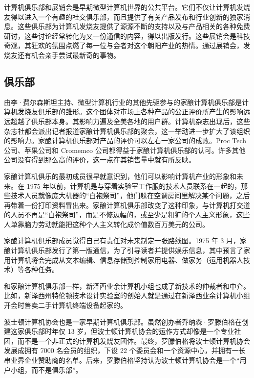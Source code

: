 \documentclass[12pt,UTF8]{ctexbook}
\begin{document}
计算机俱乐部和展销会是早期微型计算机世界的公共平台。它们不仅让计算机发烧友得以进入一个有趣的社交俱乐部，而且提供了有关产品发布和行业创新的独家消息。这些俱乐部为计算机发烧友提供了源源不断的支持以及与产品相关的各种免费研讨，这些讨论经常转化为又一份通信的内容，得以出版发行。这些展销会是科技奇观，其狂欢的氛围点燃了每一位与会者对这个朝阳产业的热情。通过展销会，发烧友还有机会亲手尝试最新奇的事物。





\subsection{俱乐部}


由李·费尔森斯坦主持、微型计算机行业的其他先驱参与的家酿计算机俱乐部是计算机发烧友俱乐部的雏形。这个团体对市场上各种产品的公正评价所产生的影响远远超越了俱乐部本身。其影响力遍及全美各地的用户群。计算机杂志出现后，这些杂志社都会派出记者报道家酿计算机俱乐部的聚会，这一举动进一步扩大了该组织的影响力。家酿计算机俱乐部对产品的评价可以左右一家公司的成败。Proc Tech 公司、苹果公司和 Cromemco 公司都得益于家酿计算机俱乐部的认可。许多其他公司没有得到那么高的评价，这一点在其销售量中就有所反映。

家酿计算机俱乐的最初成员很早就意识到，他们可以影响计算机产业的形象和未来。在 1975 年以前，计算机是与穿着实验室工作服的技术人员联系在一起的，那些技术人员就像庞大机器的“白袍祭司”，他们躲在空调房间里解决某个问题，之后再带着一份打印资料冒出来。家酿计算机俱乐部改变了这种印象，与计算机打交道的人员不再是“白袍祭司”，而是不修边幅的，或至少是粗犷的个人主义形象，这些人单靠脑力劳动就能把这种个人主义转化成价值数百万美元的公司。

家酿计算机俱乐部成员觉得自己有责任对未来制定一张路线图。1975 年 3 月，家酿计算机俱乐部发行了第一版通信，为了引导读者并提供娱乐信息，其中预言了家用计算机将会完成从文本编辑、信息存储到控制家用电器、做家务（运用机器人技术）等各种任务。

和家酿计算机俱乐部一样，新泽西业余计算机小组也成了新技术的仲裁者和中介。比如，新泽西州特伦顿技术设计实验室的创始人就是通过在新泽西业余计算机小组开会时售卖二手计算机终端设备起家的。

波士顿计算机协会也是一家早期计算机俱乐部。虽然创办者乔纳森·罗滕伯格在创建这家俱乐部时年仅 13 岁，但波士顿计算机协会的运作方式却像是一个专业社团，而不是一个非正式的计算机发烧友团体。最终，罗滕伯格将波士顿计算机协会发展成拥有 7000 名会员的组织，下设 22 个委员会和一个资源中心，并拥有一长串业界企业赞助商的名单。后来，罗滕伯格坚持认为波士顿计算机协会是一个“用户小组，而不是俱乐部”。
\end{document}
